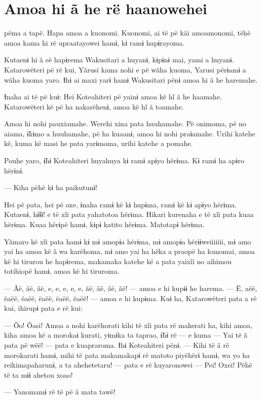 \chapter{Amoa hi ã he rë haanowehei}
 
 pëma a tapë. Hapa amoa a kuonomi. Kuonomi, ai të pë kãi amoamonomi,
tëhë amoa kama hi rë upraatayowei hamɨ, kɨ ramɨ hupɨrayoma. 

Kutaenɨ hi ã eë hapɨrema Wakusitari a huyanɨ, kɨpɨnɨ mai, yami a huyanɨ.
Katarowëteri pë rë kui, Yãrusi kama nohi e pë wãha kuoma, Yarusi përɨamɨ
a wãha kuoma yaro. Ɨhɨ ai maxi yarɨ hamɨ Wakusitari pënɨ amoa hi ã he
haremahe.

Ɨnaha ai të pë kuɨ: Hei Koteahiteri pë yainɨ amoa kë hĩ ã he haamahe.
Katarowëteri kë pë ha nakarëhenɨ, amoa kë hĩ ã toamahe. 

Amoa hi nohi pauxiamahe. Werehi xina pata huuhamahe. Pë onimoma, pë no
aiama, ɨ̃kɨmo a huuhamahe, pë ha kuaanɨ, amoa hi nohi praɨamahe. Urihi
katehe kë, kuma kë masi he pata yarɨmoma, urihi katehe a pomahe. 

Pouhe yaro, ɨ̃hɨ Koteahiteri huyahuya kɨ ramɨ apɨyo hërɨma. Kɨ ramɨ ha
apɨro hërɨnɨ. 

--- Kiha pëhë kɨ ha paikutunɨ! 

Hei pë pata, hei pë oxe, ɨnaha ramɨ kë kɨ hupɨma, ramɨ kë kɨ apɨyo
hërɨma. Kutaenɨ, hɨ̃ɨɨ! e të xĩi pata yahatotoa hërɨma. Hikari kurenaha e
të xĩi pata kuaa hërɨma. Kuaa hërɨpë hamɨ, kɨpɨ katito hërɨma. Matotapɨ
hërɨma. 

Yãmaro kë xĩi pata hamɨ kɨ mɨ amopɨa hërɨma, mɨ amopɨa hërɨɨweiiiiiii,
mɨ amo yai ha amoa kë ã wa karëhoma, mɨ amo yai ha hẽka a praopë ha
kunomai, amoa kë hi tirurou he hapɨrema, makamaka katehe kë a pata
yaixĩi no aihimou totihiopë hamɨ, amoa kë hi tiruroma. 

--- Ãë, ãë, ãë, e, e, e, e, e, ãë, ãë, ãë, ãë! --- amoa e hi kupɨɨ he
harema. --- Ë, aëë, ëaëë, ëaëë, ëaëë, ëaëë, ëaëë! --- amoa e hi kupɨma.
Kuɨ ha, Katarowëteri pata a rë kui, ihirupɨ pata e rë kui: 

--- Õo! Õasi! Amoa a nohi karëhorati kihi të xĩi pata rë makerati ha,
kihi amoa, kiha amoa kë a morokaɨ kurati, yɨmɨka ta taprao, ɨ̃hɨ rë --- e
kuma --- Yai të ã pata pë wëë! --- pata e kuapraroma. Ɨhɨ Koteahiteri
pënɨ. --- Kihi të ã rë morokarati hamɨ, mihi të pata makamakapɨ rë
matoto piyëhërɨ hamɨ, wa yo ha reikimapaharunɨ, a ta ahehetetaru! ---
pata e rë kuyaronowei --- Pei! Oxei! Pëhë të ta mɨɨ ahetou xoao! 

--- Yanomamɨ rë të pë ã mata tawë! 

